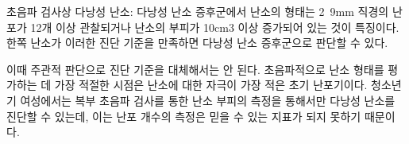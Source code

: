 \begin{commentbox}{}
초음파 검사상 다낭성 난소: 다낭성 난소 증후군에서 난소의 형태는 2~9mm 직경의 난포가 12개 이상 관찰되거나 난소의 부피가 10cm3 이상 증가되어 있는 것이 특징이다. 한쪽 난소가 이러한 진단 기준을 만족하면 다낭성 난소 증후군으로 판단할 수 있다. \par
이때 주관적 판단으로 진단 기준을 대체해서는 안 된다. 초음파적으로 난소 형태를 평가하는 데 가장 적절한 시점은 난소에 대한 자극이 가장 적은 초기 난포기이다. 청소년기 여성에서는 복부 초음파 검사를 통한 난소 부피의 측정을 통해서만 다낭성 난소를 진단할 수 있는데, 이는 난포 개수의 측정은 믿을 수 있는 지표가 되지 못하기 때문이다.
\end{commentbox}